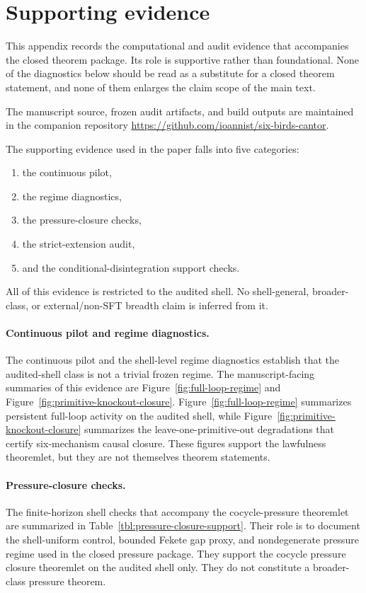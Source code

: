 \section{Supporting evidence}\label{sec:appendix-supporting-evidence}

This appendix records the computational and audit evidence that accompanies the closed theorem package. Its role is supportive rather than foundational. None of the diagnostics below should be read as a substitute for a closed theorem statement, and none of them enlarges the claim scope of the main text.

The manuscript source, frozen audit artifacts, and build outputs are maintained in the companion repository \url{https://github.com/ioannist/six-birds-cantor}.

The supporting evidence used in the paper falls into five categories:
\begin{enumerate}
    \item the continuous pilot,
    \item the regime diagnostics,
    \item the pressure-closure checks,
    \item the strict-extension audit,
    \item and the conditional-disintegration support checks.
\end{enumerate}
All of this evidence is restricted to the audited shell. No shell-general, broader-class, or external/non-SFT breadth claim is inferred from it.

\paragraph{Continuous pilot and regime diagnostics.}
The continuous pilot and the shell-level regime diagnostics establish that the audited-shell class is not a trivial frozen regime. The manuscript-facing summaries of this evidence are Figure~\ref{fig:full-loop-regime} and Figure~\ref{fig:primitive-knockout-closure}. Figure~\ref{fig:full-loop-regime} summarizes persistent full-loop activity on the audited shell, while Figure~\ref{fig:primitive-knockout-closure} summarizes the leave-one-primitive-out degradations that certify six-mechanism causal closure. These figures support the lawfulness theoremlet, but they are not themselves theorem statements.

\paragraph{Pressure-closure checks.}
The finite-horizon shell checks that accompany the cocycle-pressure theoremlet are summarized in Table~\ref{tbl:pressure-closure-support}. Their role is to document the shell-uniform control, bounded Fekete gap proxy, and nondegenerate pressure regime used in the closed pressure package. They support the cocycle pressure closure theoremlet on the audited shell only. They do not constitute a broader-class pressure theorem.

